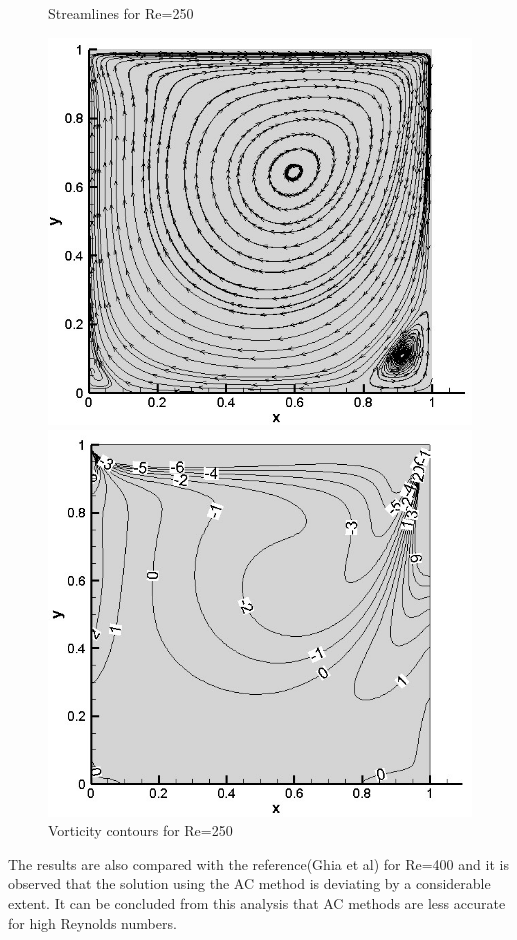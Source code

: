 \documentclass[12pt]{elsarticle}
\begin{document}
	\begin{figure}[h]
		\caption{Streamlines for Re=250}
		\centering\includegraphics[width=0.8\linewidth]{35_100_100_re_250_streamlines}
		\caption{Vorticity contours for Re=250}
		\centering\includegraphics[width=0.8\linewidth]{36_100_100_re_250_vorticity}
	\end{figure}
	\clearpage
	
	The results are also compared with the reference(Ghia et al) for Re=400 and it is observed that the solution using the AC method is deviating by a considerable extent. It can be concluded from this analysis that AC methods are less accurate for high Reynolds numbers. 
	
\end{document}
